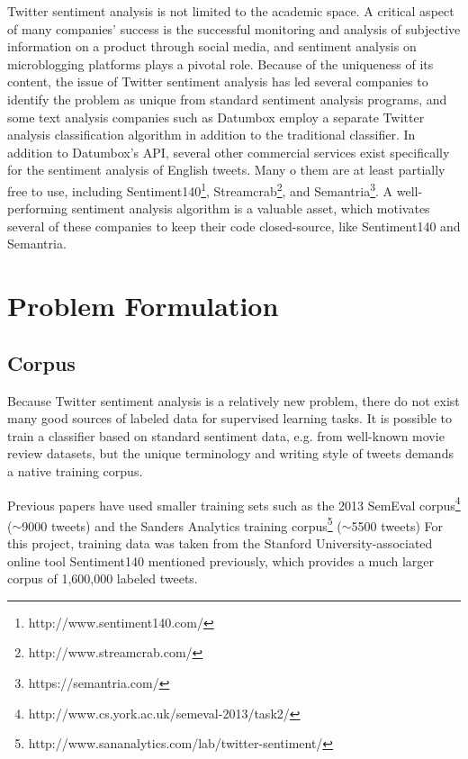 \documentclass[letter,12pt]{article}
\begin{document}
Twitter sentiment analysis is not limited to the academic space. A critical
aspect of many companies' success is the successful monitoring and analysis of
subjective information on a product through social media, and sentiment
analysis on microblogging platforms plays a pivotal role. Because of the
uniqueness of its content, the issue of Twitter sentiment analysis has led
several companies to identify the problem as unique from standard sentiment
analysis programs, and some text analysis companies such as Datumbox employ a
separate Twitter analysis classification algorithm in addition to the
traditional classifier. In addition to Datumbox's API, several other commercial
services exist specifically for the sentiment analysis of English tweets. Many
o them are at least partially free to use, including
Sentiment140\footnote{http://www.sentiment140.com/},
Streamcrab\footnote{http://www.streamcrab.com/}, and
Semantria\footnote{https://semantria.com/}. A well-performing sentiment
analysis algorithm is a valuable asset, which motivates several of these
companies to keep their code closed-source, like Sentiment140 and Semantria.

\section{Problem Formulation}

\subsection{Corpus}
Because Twitter sentiment analysis is a relatively new
problem, there do not exist many good sources of labeled data for supervised
learning tasks. It is possible to train a classifier based on standard
sentiment data, e.g. from well-known movie review datasets, but the unique
terminology and writing style of tweets demands a native training corpus.

Previous papers have used smaller training sets such as the 2013 SemEval
corpus\footnote{http://www.cs.york.ac.uk/semeval-2013/task2/} ($\sim$9000
tweets) and the Sanders Analytics training
corpus\footnote{http://www.sananalytics.com/lab/twitter-sentiment/} ($\sim$5500
tweets) For this project, training data was taken from the Stanford
University-associated online tool Sentiment140 mentioned previously, which
provides a much larger corpus of 1,600,000 labeled tweets.
\end{document}
